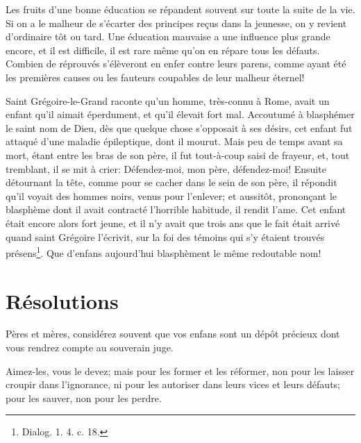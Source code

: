 \documentclass[instructions.tex]{subfiles}
\begin{document}
Les fruits d'une bonne éducation se répandent souvent sur toute la suite de la vie. Si on a le malheur de s'écarter des principes reçus dans la jeunesse, on y revient d'ordinaire tôt ou tard. Une éducation mauvaise a une influence plus grande encore, et il est difficile, il est rare même qu'on en répare tous les défauts. Combien de réprouvés s'élèveront en enfer contre leurs parens, comme ayant été les premières causes ou les fauteurs coupables de leur malheur éternel!
 
Saint Grégoire-le-Grand raconte qu'un homme, très-connu à Rome, avait un enfant qu'il aimait éperdument, et qu'il élevait fort mal. Accoutumé à blasphémer le saint nom de Dieu, dès que quelque chose s'opposait à ses désirs, cet enfant fut attaqué d'une maladie épileptique, dont il mourut. Mais peu de temps avant sa mort, étant entre les bras de son père, il fut tout-à-coup saisi de frayeur, et, tout tremblant, il se mit à crier: Défendez-moi, mon père, défendez-moi! Ensuite détournant la tête, comme pour se cacher dans le sein de son père, il répondit qu'il voyait des hommes noirs, venus pour l'enlever; et aussitôt, prononçant le blasphème dont il avait contracté l'horrible habitude, il rendit l'ame. Cet enfant était encore alors fort jeune, et il n'y avait que trois ans que le fait était arrivé quand saint Grégoire l'écrivit, sur la foi des témoins qui s'y étaient trouvés présens\footnote{Dialog. 1. 4. c. 18.}. Que d'enfans aujourd'hui blasphèment le même redoutable nom!
 
\section{Résolutions}
 
\primo Pères et mères, considérez souvent que vos enfans sont un dépôt précieux dont vous rendrez compte au souverain juge.
 
\secundo Aimez-les, vous le devez; mais pour les former et les réformer, non pour les laisser croupir dans l'ignorance, ni pour les autoriser dans leurs vices et leurs défauts; pour les sauver, non pour les perdre. 

 
\end{document}
